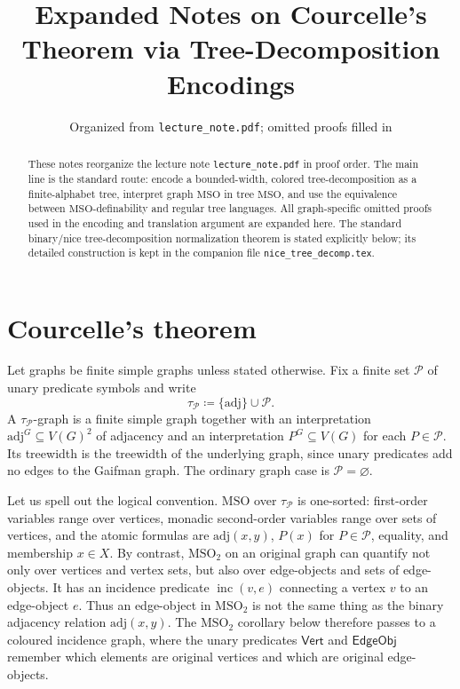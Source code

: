 \documentclass[11pt]{article}
\title{Expanded Notes on Courcelle's Theorem via Tree-Decomposition Encodings}
\author{Organized from \texttt{lecture\_note.pdf}; omitted proofs filled in}
\date{}
\theoremstyle{definition}
\newcommand{\MSO}{\ensuremath{\mathrm{MSO}}}
\newcommand{\MSOtwo}{\ensuremath{\mathrm{MSO}_2}}
\newcommand{\defeq}{\coloneqq}
\newcommand{\adj}{\mathrm{adj}}
\newcommand{\Pred}{\mathcal P}
\newcommand{\Vrt}{\mathsf{Vert}}
\newcommand{\EObj}{\mathsf{EdgeObj}}
\begin{document}
\maketitle

\begin{abstract}
These notes reorganize the lecture note \texttt{lecture\_note.pdf} in proof order.
The main line is the standard route: encode a bounded-width, colored tree-decomposition as a finite-alphabet tree, interpret graph \MSO{} in tree \MSO{},
and use the equivalence between \MSO{}-definability and regular tree languages.
All graph-specific omitted proofs used in the encoding and translation argument
are expanded here.  The standard binary/nice tree-decomposition normalization
theorem is stated explicitly below; its detailed construction is kept in the
companion file \texttt{nice\_tree\_decomp.tex}.
\end{abstract}

\tableofcontents

\section{Courcelle's theorem}

Let graphs be finite simple graphs unless stated otherwise.  Fix a finite set
\(\Pred\) of unary predicate symbols and write
\[
  \tau_{\Pred}\defeq \{\adj\}\cup\Pred .
\]
A \(\tau_{\Pred}\)-graph is a finite simple graph together with an interpretation
\(\adj^G\subseteq V(G)^2\) of adjacency and an interpretation
\(P^G\subseteq V(G)\) for each \(P\in\Pred\).  Its treewidth is the treewidth of
the underlying graph, since unary predicates add no edges to the Gaifman graph.
The ordinary graph case is \(\Pred=\varnothing\).

Let us spell out the logical convention.  \MSO{} over \(\tau_{\Pred}\) is
one-sorted: first-order variables range over vertices, monadic second-order
variables range over sets of vertices, and the atomic formulas are
\(\adj(x,y)\), \(P(x)\) for \(P\in\Pred\), equality, and membership \(x\in X\).
By contrast, \MSOtwo{} on an original graph can quantify not only over vertices
and vertex sets, but also over edge-objects and sets of edge-objects.  It has an
incidence predicate \(\operatorname{inc}(v,e)\) connecting a vertex \(v\) to an
edge-object \(e\).  Thus an edge-object in \MSOtwo{} is not the same thing as
the binary adjacency relation \(\adj(x,y)\).  The \MSOtwo{} corollary below
therefore passes to a coloured incidence graph, where the unary predicates
\(\Vrt\) and \(\EObj\) remember which elements are original vertices and which
are original edge-objects.
\end{document}
